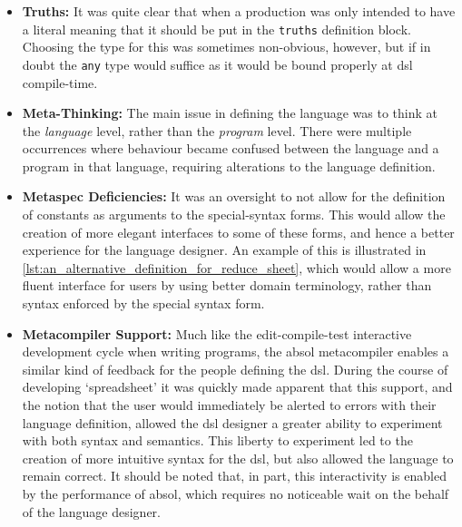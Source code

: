 \begin{itemize}
    \item \textbf{Truths:} It was quite clear that when a production was only intended to have a literal meaning that it should be put in the \texttt{truths} definition block.
    Choosing the type for this was sometimes non-obvious, however, but if in doubt the \texttt{any} type would suffice as it would be bound properly at \gls{dsl} compile-time.
    \item \textbf{Meta-Thinking:} The main issue in defining the language was to think at the \textit{language} level, rather than the \textit{program} level.
    There were multiple occurrences where behaviour became confused between the language and a program in that language, requiring alterations to the language definition. 
    \item \textbf{Metaspec Deficiencies:} It was an oversight to not allow for the definition of constants as arguments to the special-syntax forms. 
    This would allow the creation of more elegant interfaces to some of these forms, and hence a better experience for the language designer.
    An example of this is illustrated in \autoref{lst:an_alternative_definition_for_reduce_sheet}, which would allow a more fluent interface for users by using better domain terminology, rather than syntax enforced by the special syntax form. 
    \item \textbf{Metacompiler Support:} Much like the edit-compile-test interactive development cycle when writing programs, the \gls{absol} metacompiler enables a similar kind of feedback for the people defining the \gls{dsl}.
    During the course of developing `spreadsheet' it was quickly made apparent that this support, and the notion that the user would immediately be alerted to errors with their language definition, allowed the \gls{dsl} designer a greater ability to experiment with both syntax and semantics.
    This liberty to experiment led to the creation of more intuitive syntax for the \gls{dsl}, but also allowed the language to remain correct.
    It should be noted that, in part, this interactivity is enabled by the performance of \gls{absol}, which requires no noticeable wait on the behalf of the language designer. 
\end{itemize}


